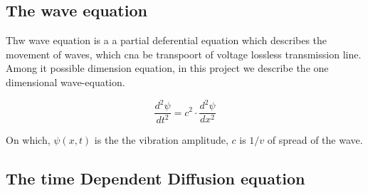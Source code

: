 \subsection{The wave equation}
Thw wave equation is a a partial deferential equation which describes the movement of waves, which cna be transpoort of voltage
lossless transmission line. Among it possible dimension equation,
in this project we describe the one dimensional wave-equation.

\begin{equation}
    \frac{d^{2} \psi}{dt^2} = c^{2} \cdot \frac{d^{2} \psi}{dx^2}
\end{equation}

On which, $\psi(x,t)$ is the the vibration amplitude, $c$ is $1/v$ of spread of the wave.

\subsection{The time Dependent Diffusion equation}